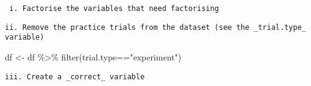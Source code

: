\documentclass[
]{article}
\newenvironment{Shaded}{\begin{snugshade}}{\end{snugshade}}
\newcommand{\DecValTok}[1]{\textcolor[rgb]{0.00,0.00,0.81}{#1}}
\newcommand{\FunctionTok}[1]{\textcolor[rgb]{0.00,0.00,0.00}{#1}}
\newcommand{\NormalTok}[1]{#1}
\newcommand{\OtherTok}[1]{\textcolor[rgb]{0.56,0.35,0.01}{#1}}
\newcommand{\SpecialCharTok}[1]{\textcolor[rgb]{0.00,0.00,0.00}{#1}}
\newcommand{\StringTok}[1]{\textcolor[rgb]{0.31,0.60,0.02}{#1}}
\begin{document}
\begin{verbatim}
 i. Factorise the variables that need factorising  
\end{verbatim}

\begin{Shaded}
\end{Shaded}

\begin{verbatim}
ii. Remove the practice trials from the dataset (see the _trial.type_ variable)
\end{verbatim}

\begin{Shaded}
\begin{Highlighting}[]
\NormalTok{df }\OtherTok{\textless{}{-}}\NormalTok{ df }\SpecialCharTok{\%\textgreater{}\%} 
  \FunctionTok{filter}\NormalTok{(trial.type}\SpecialCharTok{==}\StringTok{"experiment"}\NormalTok{)}
\end{Highlighting}
\end{Shaded}

\begin{verbatim}
iii. Create a _correct_ variable  
\end{verbatim}

\begin{Shaded}
\end{Shaded}
\end{document}
